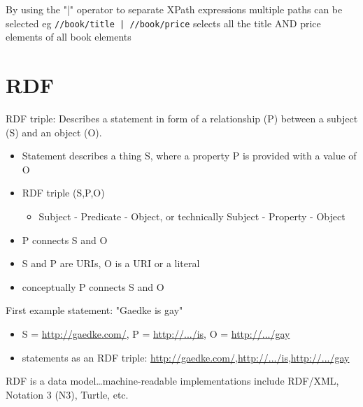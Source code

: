 \documentclass[11pt]{article}
\begin{document}
By using the "|" operator to separate XPath expressions multiple paths can be selected eg \texttt{//book/title | //book/price} selects all the title AND price elements of all book elements

\section{RDF}
\label{sec:orgdd0c5a0}
RDF triple: Describes a statement in form of a relationship (P) between a subject (S) and an object (O).
\begin{itemize}
\item Statement describes a thing S, where a property P is provided with a value of O
\item RDF triple (S,P,O)
\begin{itemize}
\item Subject - Predicate - Object, or technically Subject - Property - Object
\end{itemize}
\item P connects S and O
\item S and P are URIs, O is a URI or a literal
\item conceptually P connects S and O
\end{itemize}

First example statement: "Gaedke is gay"
\begin{itemize}
\item S = \url{http://gaedke.com/}, P = \url{http://.../is}, O = \url{http://.../gay}
\item statements as an RDF triple: \url{http://gaedke.com/},\url{http://.../is},\url{http://.../gay}
\end{itemize}

RDF is a data model\ldots{}machine-readable implementations include RDF/XML, Notation 3 (N3), Turtle, etc.
\end{document}
